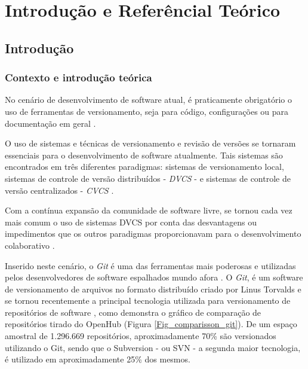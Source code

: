 \part{Introdução e Referêncial Teórico}

\chapter[Introdução]{Introdução}




\section{Contexto e introdução teórica}
No cenário de desenvolvimento de software atual, é praticamente obrigatório o uso de ferramentas de versionamento, seja para código, configurações ou para documentação em geral \cite{version_control_git}.

O uso de sistemas e técnicas de versionamento e revisão de versões se tornaram essenciais para o desenvolvimento de software atualmente.
Tais sistemas são encontrados em três diferentes paradigmas: sistemas de versionamento local, sistemas de controle de versão distribuídos - \textit{DVCS} - e sistemas de controle de versão centralizados - \textit{CVCS} \cite{version_control_review}.

Com a contínua expansão da comunidade de software livre, se tornou cada vez mais comum o uso de sistemas DVCS por conta das desvantagens ou impedimentos que os outros paradigmas proporcionavam para o desenvolvimento colaborativo \cite{version_control_review} \cite{version_control_git}.


Inserido neste cenário, o \textit{Git} é uma das ferramentas mais poderosas e utilizadas pelos desenvolvedores de software espalhados mundo afora \cite{git_version_cookbook}. O \textit{Git}, é um software de versionamento de arquivos no formato distribuído criado por Linus Torvalds
e se tornou recentemente a principal tecnologia utilizada para versionamento de repositórios de software \cite{openhub_git_svn}, como demonstra o gráfico de comparação de repositórios tirado do OpenHub (Figura \ref{Fig_comparisson_git}).
De um espaço amostral de 1.296.669 repositórios, aproximadamente 70\% são versionados utilizando o Git, sendo que o Subversion - ou SVN - a segunda maior tecnologia, é utilizado em aproximadamente 25\% dos mesmos.


